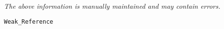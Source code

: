 \label{pkg:weak\_reference}

{\tiny \it The above information is manually maintained and may contain errors.}
\begin{verbatim}
Weak_Reference
\end{verbatim}
